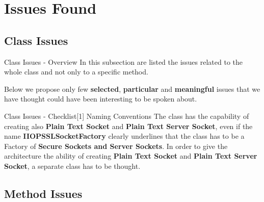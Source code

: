 \documentclass{../common/latex_classes/pdf_presentation}
\begin{document}
	\section{Issues Found}
	
	\subsection{Class Issues}
	
	\begin{frame}{Class Issues - Overview}
		In this subsection are listed the issues related to the whole class and not only to a specific method. \par Below we propose only few \textbf{selected}, \textbf{particular} and \textbf{meaningful} issues that we have thought could have been interesting to be spoken about.
	\end{frame}
	\begin{frame}{Class Issues - Checklist[1] Naming Conventions}
		The class has the capability of creating also \textbf{Plain Text Socket} and \textbf{Plain Text Server Socket}, even if the name \textbf{IIOPSSLSocketFactory} clearly underlines that the class has to be a Factory of \textbf{Secure Sockets and Server Sockets}. In order to give the architecture the ability of creating \textbf{Plain Text Socket} and \textbf{Plain Text Server Socket}, a separate class has to be thought.
	\end{frame}
	
	\subsection{Method Issues}
	
\end{document}
